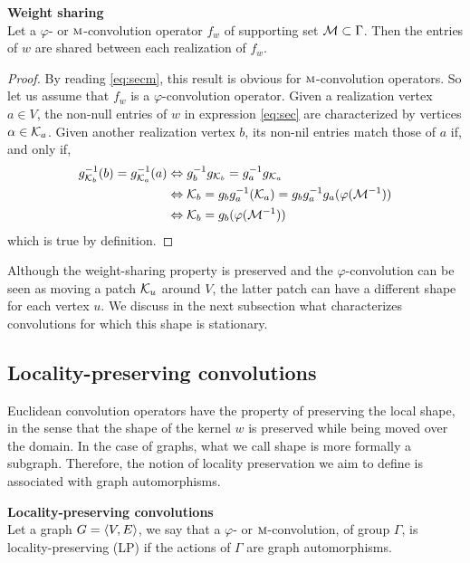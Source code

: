 \begin{proposition}\textbf{Weight sharing}\\
Let a $\varphi$- or $\operatorname{\textsc{m}}$-convolution operator $f_w$ of supporting set $\mathcal{M} \subset \Gamma$. Then the entries of $w$ are shared between each realization of $f_w$.
\end{proposition}
\begin{proof}
By reading \eqref{eq:secm}, this result is obvious for $\operatorname{\textsc{m}}$-convolution operators. So let us assume that $f_w$ is a $\varphi$-convolution operator. Given a realization vertex $a \in V$, the non-null entries of $w$ in expression \eqref{eq:sec} are characterized by vertices $\alpha \in \mathcal{K}_a$. Given another realization vertex $b$, its non-nil entries match those of $a$ if, and only if,
\begin{align*}
g_{\mathcal{K}_b}^{-1}(b) = g_{\mathcal{K}_a}^{-1}(a)
  & \Leftrightarrow  g_{b}^{-1}g_{\mathcal{K}_{b}} = g_a^{-1}g_{\mathcal{K}_a}\\
  & \Leftrightarrow  \mathcal{K}_{b} = g_{b}g_a^{-1}(\mathcal{K}_a) = g_{b}g_a^{-1}g_a(\varphi(\mathcal{M}^{-1}))\\
  & \Leftrightarrow  \mathcal{K}_{b} = g_{b}(\varphi(\mathcal{M}^{-1}))
\end{align*}
which is true by definition.
\end{proof}

Although the weight-sharing property is preserved and the $\varphi$-convolution can be seen as moving a patch $\mathcal{K}_u$ around $V$, the latter patch can have a different shape for each vertex $u$. We discuss in the next subsection what characterizes convolutions for which this shape is stationary.

\subsection{Locality-preserving convolutions}

Euclidean convolution operators have the property of preserving the local shape, in the sense that the shape of the kernel $w$ is preserved while being moved over the domain. In the case of graphs, what we call shape is more formally a subgraph. Therefore, the notion of locality preservation we aim to define is associated with graph automorphisms.

\begin{definition}\textbf{Locality-preserving convolutions}\\
Let a graph $G = \langle V, E \rangle$, we say that a $\varphi$- or $\operatorname{\textsc{m}}$-convolution, of group $\Gamma$, is locality-preserving (LP) if the actions of $\Gamma$ are graph automorphisms.
\end{definition}

